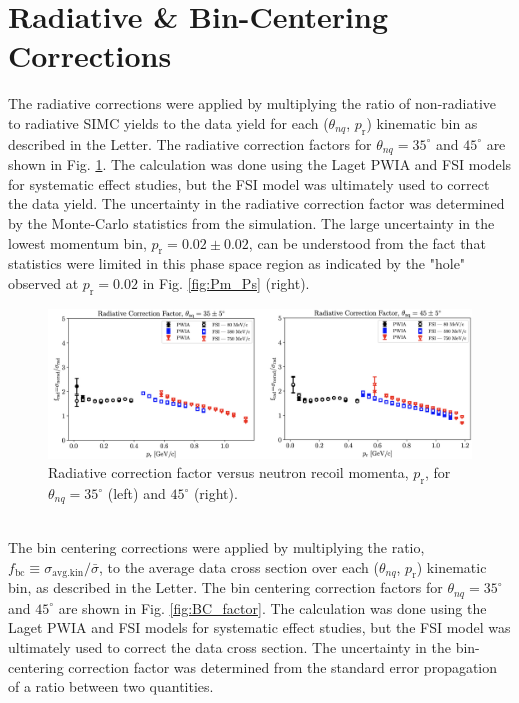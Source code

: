 \documentclass[aps, prl]{revtex4-2}  %
\begin{document}
\section{\large Radiative \& Bin-Centering Corrections}
\noindent The radiative corrections were applied by multiplying the ratio of non-radiative to radiative SIMC yields to the data yield for each ($\theta_{nq}$, $p_{\mathrm{r}}$)
kinematic bin as described in the Letter. The radiative correction factors for $\theta_{nq}=35^{\circ}$ and $45^{\circ}$ are shown in Fig. \ref{fig:RC_factor}. The calculation was done using the
Laget PWIA and FSI models for systematic effect studies, but the FSI model was ultimately used to correct the data yield. The uncertainty in the radiative
correction factor was determined by the Monte-Carlo statistics from the simulation. The large uncertainty in the lowest momentum bin, $p_{\mathrm{r}} = 0.02\pm0.02$, can
be understood from the fact that statistics were limited in this phase space region as indicated by the "hole" observed at $p_{\mathrm{r}} = 0.02$ in Fig. \ref{fig:Pm_Ps} (right). 
\begin{figure}[!h]
\includegraphics[scale=0.26]{plots/RC_factor.png}
\caption{Radiative correction factor versus neutron recoil momenta, $p_{\mathrm{r}}$, for $\theta_{nq}=35^{\circ}$ (left) and $45^{\circ}$ (right). }
\label{fig:RC_factor}
\end{figure}\\
The bin centering corrections were applied by multiplying the ratio, $f_{\mathrm{bc}} \equiv \sigma_{\mathrm{avg.kin}}/\bar{\sigma}$, to the average data cross section over each ($\theta_{nq}$, $p_{\mathrm{r}}$)
kinematic bin, as described in the Letter. The bin centering correction factors for $\theta_{nq}=35^{\circ}$ and $45^{\circ}$ are shown in
Fig. \ref{fig:BC_factor}. The calculation was done using the Laget PWIA and FSI models for systematic effect studies, but the FSI model was ultimately used to correct the data cross section. The
uncertainty in the bin-centering correction factor was determined from the standard error propagation of a ratio between two quantities. 
\end{document}
